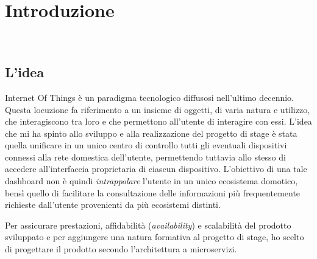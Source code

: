 
\chapter{Introduzione}
\label{cap:introduzione}

\\

%
%

\section{L'idea}

Internet Of Things è un paradigma tecnologico diffusosi nell'ultimo decennio. Questa locuzione fa riferimento a un insieme di oggetti,
di varia natura e utilizzo, che interagiscono tra loro e che permettono all'utente di interagire con essi.
L'idea che mi ha spinto allo sviluppo e alla realizzazione del progetto di stage è stata quella unificare in un unico centro di controllo
tutti gli eventuali dispositivi connessi alla rete domestica dell'utente, permettendo
tuttavia allo stesso di accedere all'interfaccia proprietaria di ciascun dispositivo.
L'obiettivo di una tale dashboard non è quindi \textit{intrappolare} l'utente in un unico ecosistema domotico,
bensì quello di facilitare la consultazione delle informazioni più frequentemente richieste dall'utente provenienti da più ecosistemi distinti.

Per assicurare prestazioni, affidabilità (\textit{availability}) e scalabilità del prodotto sviluppato e per aggiungere una natura formativa al progetto di stage,
ho scelto di progettare il prodotto secondo l'architettura a microservizi.

